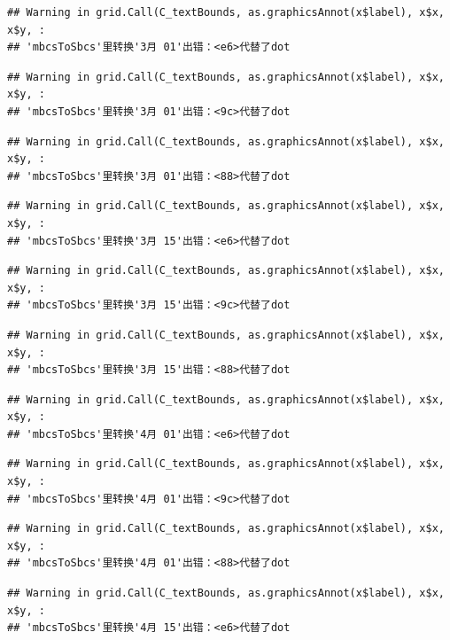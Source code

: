 \documentclass[
]{article}
\begin{document}
\begin{verbatim}
## Warning in grid.Call(C_textBounds, as.graphicsAnnot(x$label), x$x, x$y, :
## 'mbcsToSbcs'里转换'3月 01'出错：<e6>代替了dot
\end{verbatim}

\begin{verbatim}
## Warning in grid.Call(C_textBounds, as.graphicsAnnot(x$label), x$x, x$y, :
## 'mbcsToSbcs'里转换'3月 01'出错：<9c>代替了dot
\end{verbatim}

\begin{verbatim}
## Warning in grid.Call(C_textBounds, as.graphicsAnnot(x$label), x$x, x$y, :
## 'mbcsToSbcs'里转换'3月 01'出错：<88>代替了dot
\end{verbatim}

\begin{verbatim}
## Warning in grid.Call(C_textBounds, as.graphicsAnnot(x$label), x$x, x$y, :
## 'mbcsToSbcs'里转换'3月 15'出错：<e6>代替了dot
\end{verbatim}

\begin{verbatim}
## Warning in grid.Call(C_textBounds, as.graphicsAnnot(x$label), x$x, x$y, :
## 'mbcsToSbcs'里转换'3月 15'出错：<9c>代替了dot
\end{verbatim}

\begin{verbatim}
## Warning in grid.Call(C_textBounds, as.graphicsAnnot(x$label), x$x, x$y, :
## 'mbcsToSbcs'里转换'3月 15'出错：<88>代替了dot
\end{verbatim}

\begin{verbatim}
## Warning in grid.Call(C_textBounds, as.graphicsAnnot(x$label), x$x, x$y, :
## 'mbcsToSbcs'里转换'4月 01'出错：<e6>代替了dot
\end{verbatim}

\begin{verbatim}
## Warning in grid.Call(C_textBounds, as.graphicsAnnot(x$label), x$x, x$y, :
## 'mbcsToSbcs'里转换'4月 01'出错：<9c>代替了dot
\end{verbatim}

\begin{verbatim}
## Warning in grid.Call(C_textBounds, as.graphicsAnnot(x$label), x$x, x$y, :
## 'mbcsToSbcs'里转换'4月 01'出错：<88>代替了dot
\end{verbatim}

\begin{verbatim}
## Warning in grid.Call(C_textBounds, as.graphicsAnnot(x$label), x$x, x$y, :
## 'mbcsToSbcs'里转换'4月 15'出错：<e6>代替了dot
\end{verbatim}
\end{document}
